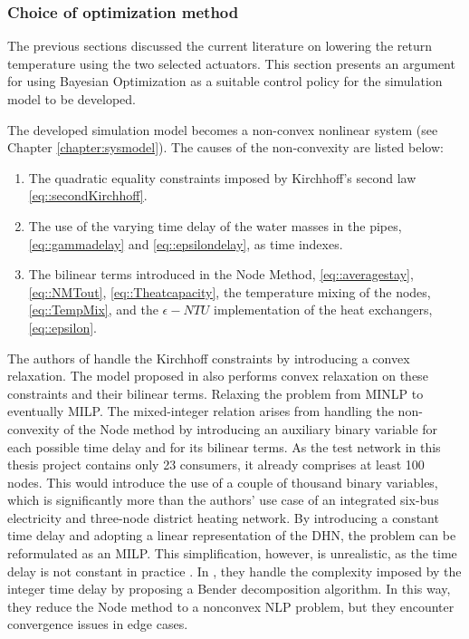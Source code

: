 \subsubsection{Choice of optimization method}
The previous sections discussed the current literature on lowering the return temperature using the two selected actuators. This section presents an argument for using Bayesian Optimization as a suitable control policy for the simulation model to be developed. 

The developed simulation model becomes a non-convex nonlinear system (see Chapter \ref{chapter:sysmodel}). The causes of the non-convexity are listed below:

\begin{enumerate}
    \item  The quadratic equality constraints imposed by Kirchhoff's second law \eqref{eq::secondKirchhoff}.
    \item The use of the varying time delay of the water masses in the pipes, \eqref{eq::gammadelay} and \eqref{eq::epsilondelay}, as time indexes.
    \item The bilinear terms introduced in the Node Method, \eqref{eq::averagestay}, \eqref{eq::NMTout}, \eqref{eq::Theatcapacity}, the temperature mixing of the nodes, \eqref{eq::TempMix}, and the $\epsilon-NTU$ implementation of the heat exchangers, \eqref{eq::epsilon}.
\end{enumerate}

The authors of \cite{ArtikelMax} handle the Kirchhoff constraints by introducing a convex relaxation. The model proposed in  \cite{nodeMethodbin} also performs convex relaxation on these constraints and their bilinear terms. Relaxing the problem from MINLP to eventually MILP. The mixed-integer relation arises from handling the non-convexity of the Node method by introducing an auxiliary binary variable for each possible time delay and for its bilinear terms. As the test network in this thesis project contains only 23 consumers, it already comprises at least 100 nodes. This would introduce the use of a couple of thousand binary variables, which is significantly more than the authors' use case of an integrated six-bus electricity and three-node district heating network. By introducing a constant time delay and adopting a linear representation of the DHN, the problem can be reformulated as an MILP. This simplification, however, is unrealistic, as the time delay is not constant in practice \cite{linearDHN}. In \cite{Heuristicmethod}, they handle the complexity imposed by the integer time delay by proposing a Bender decomposition algorithm. In this way, they reduce the Node method to a nonconvex NLP problem, but they encounter convergence issues in edge cases. 

